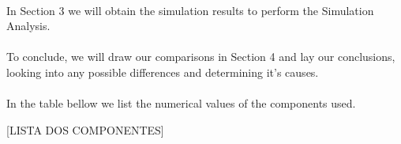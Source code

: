 \paragraph{} In Section 3 we will obtain the simulation results to perform the Simulation Analysis.

\paragraph{} To conclude, we will draw our comparisons in Section 4 and lay our conclusions, looking into any possible differences and determining it's causes.

\paragraph{} In the table bellow we list the numerical values of the components used.

[LISTA DOS COMPONENTES]

\clearpage
